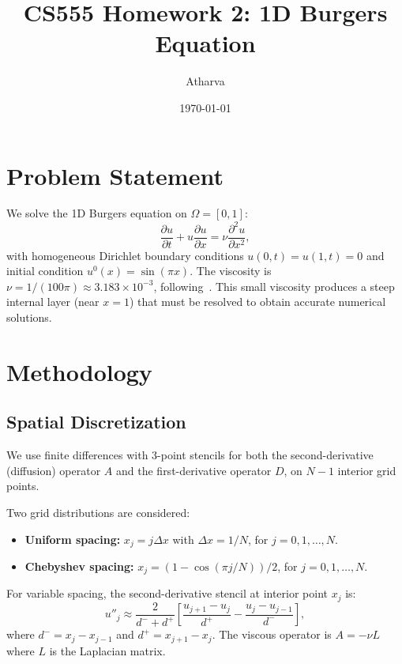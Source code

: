 \documentclass[11pt]{article}
\title{CS555 Homework 2: 1D Burgers Equation}
\author{Atharva}
\date{\today}
\begin{document}
\maketitle

\section{Problem Statement}

We solve the 1D Burgers equation on $\Omega = [0, 1]$:
\begin{equation}
\frac{\partial u}{\partial t} + u \frac{\partial u}{\partial x} = \nu \frac{\partial^2 u}{\partial x^2},
\label{eq:burgers}
\end{equation}
with homogeneous Dirichlet boundary conditions $u(0,t) = u(1,t) = 0$ and initial condition $u^0(x) = \sin(\pi x)$. The viscosity is $\nu = 1/(100\pi) \approx 3.183 \times 10^{-3}$, following~\cite{basdevant1986}. This small viscosity produces a steep internal layer (near $x = 1$) that must be resolved to obtain accurate numerical solutions.

\section{Methodology}

\subsection{Spatial Discretization}

We use finite differences with 3-point stencils for both the second-derivative (diffusion) operator $A$ and the first-derivative operator $D$, on $N-1$ interior grid points.

Two grid distributions are considered:
\begin{itemize}
\item \textbf{Uniform spacing:} $x_j = j\Delta x$ with $\Delta x = 1/N$, for $j = 0, 1, \ldots, N$.
\item \textbf{Chebyshev spacing:} $x_j = (1 - \cos(\pi j/N))/2$, for $j = 0, 1, \ldots, N$.
\end{itemize}

For variable spacing, the second-derivative stencil at interior point $x_j$ is:
\[
u''_j \approx \frac{2}{d^- + d^+}\left[\frac{u_{j+1} - u_j}{d^+} - \frac{u_j - u_{j-1}}{d^-}\right],
\]
where $d^- = x_j - x_{j-1}$ and $d^+ = x_{j+1} - x_j$. The viscous operator is $A = -\nu L$ where $L$ is the Laplacian matrix.
\end{document}
